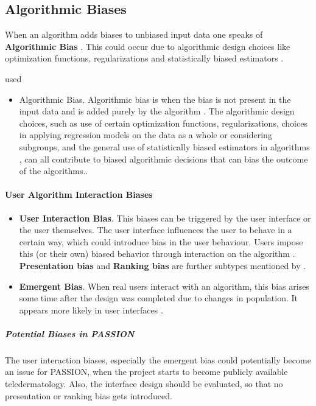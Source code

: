 \begin{refsection}
		
		\subsection{Algorithmic Biases}
		When an algorithm adds biases to unbiased input data one speaks of \textbf{Algorithmic Bias} \autocite{M9_Baeza-Yates_2018}. This could occur due to algorithmic design choices like optimization functions, regularizations and statistically biased estimators \autocite{M44_Danks_2017}.
		
		\rawcitationstart
		used
		\begin{itemize}		
			\rawcitationusedstart
			\item Algorithmic Bias. Algorithmic bias is when the bias is not present in the input data and is added purely by the algorithm \autocite{M9_Baeza-Yates_2018}. The algorithmic design choices, such as use of certain optimization functions, regularizations, choices in applying regression models on the data as a whole or considering subgroups, and the general use of statistically biased estimators in algorithms \autocite{M44_Danks_2017}, can all contribute to biased algorithmic decisions that can bias the outcome of the algorithms.\autocite{Mehrabi_2021}.
			\rawcitationusedend
		\end{itemize}
		\rawcitationend
		
		\paragraph{User Algorithm Interaction Biases}
		\begin{itemize}
			\item \textbf{User Interaction Bias}. This biases can be triggered by the user interface or the user themselves. The user interface influences the user to behave in a certain way, which could introduce bias in the user behaviour. Users impose this (or their own) biased behavior through interaction on the algorithm \autocite{M9_Baeza-Yates_2018}. \textbf{Presentation bias} and \textbf{Ranking bias} are further subtypes mentioned by \textcites{M93_Lerman_2014}{Mehrabi_2021}.
			\item \textbf{Emergent Bias}. When real users interact with an algorithm, this bias arises some time after the design was completed due to changes in population. It appears more likely in user interfaces \autocite{M53_Friedman_1996}.
		\end{itemize}
		
		
		\subparagraph{Potential Biases in PASSION}
		The user interaction biases, especially the emergent bias could potentially become an issue for PASSION, when the project starts to become publicly available \gls{teledermatology}. Also, the interface design should be evaluated, so that no presentation or ranking bias gets introduced.
		

\end{refsection}

